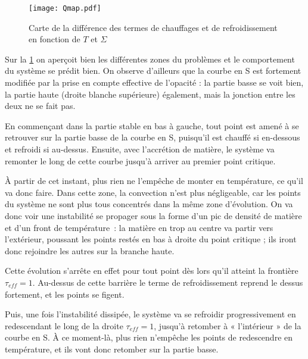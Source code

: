 \begin{figure}[!ht]
    \centering
    \texttt{[image: Qmap.pdf]}
    \caption{Carte de la différence des termes de chauffages et de refroidissement en fonction de $T$ et $\Sigma$}
    \label{fig:qmap}
\end{figure}

Sur la \cref{fig:qmap} on aperçoit bien les différentes zones du problèmes et
le comportement du système se prédit bien. On observe d’ailleurs que la courbe
en S est fortement modifiée par la prise en compte effective de l’opacité : la
partie basse se voit bien, la partie haute (droite blanche supérieure)
également, mais la jonction entre les deux ne se fait pas.

En commençant dans la partie stable en bas à gauche, tout point est amené à se
retrouver sur la partie basse de la courbe en S, puisqu’il est chauffé si
en-dessous et refroidi si au-dessus. Ensuite, avec l’accrétion de matière, le
système va remonter le long de cette courbe jusqu’à arriver au premier point
critique.

À partir de cet instant, plus rien ne l’empêche de monter en température, ce
qu’il va donc faire. Dans cette zone, la convection n’est plus négligeable, car
les points du système ne sont plus tous concentrés dans la même zone
d’évolution. On va donc voir une instabilité se propager sous la forme d’un pic
de densité de matière et d’un front de température : la matière en trop au
centre va partir vers l’extérieur, poussant les points restés en bas à droite
du point critique ; ils iront donc rejoindre les autres sur la branche haute.

Cette évolution s’arrête en effet pour tout point dès lors qu’il atteint la
frontière $\tau_{eff} = 1$. Au-dessus de cette barrière le terme de
refroidissement reprend le dessus fortement, et les points se figent.

Puis, une fois l’instabilité dissipée, le système va se refroidir
progressivement en redescendant le long de la droite $\tau_{eff} = 1$, jusqu’à
retomber à « l’intérieur » de la courbe en S. À ce moment-là, plus rien
n’empêche les points de redescendre en température, et ils vont donc retomber
sur la partie basse.
